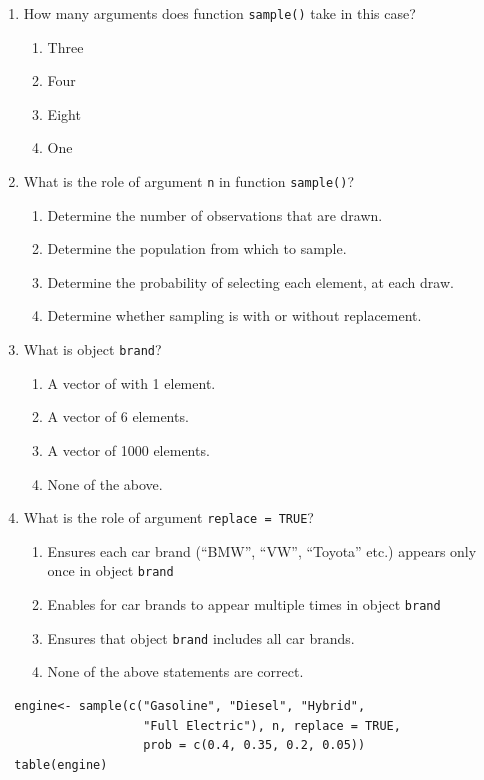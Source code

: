 \documentclass{article}
\begin{document}
\begin{enumerate}[resume]
  \item How many arguments does function \texttt{sample()} take in this case?
  \begin{enumerate}[label=\Alph*)]
    \item Three
    \item Four
    \item Eight
    \item One 
  \end{enumerate}
  \item What is the role of argument \texttt{n} in function \texttt{sample()}?
  \begin{enumerate}[label=\Alph*)]
    \item Determine the number of observations that are drawn.
    \item Determine the population from which to sample.
    \item Determine the probability of selecting each element, at each draw.
    \item Determine whether sampling is with or without replacement.
  \end{enumerate}
  \item What is object \texttt{brand}?
  \begin{enumerate}[label=\Alph*)]
    \item A vector of with 1 element.
    \item A vector of 6 elements.
    \item A vector of 1000 elements.
    \item None of the above.
  \end{enumerate}
  \item What is the role of argument \texttt{replace = TRUE}?
  \begin{enumerate}[label=\Alph*)]
    \item Ensures each car brand (``BMW'', ``VW'', ``Toyota'' etc.) appears only once in object \texttt{brand}
    \item Enables for car brands to appear multiple times in object \texttt{brand}
    \item Ensures that object \texttt{brand} includes all car brands.
    \item None of the above statements are correct.
  \end{enumerate}
\end{enumerate}

\newpage

\begin{lstlisting}
  engine<- sample(c("Gasoline", "Diesel", "Hybrid", 
                    "Full Electric"), n, replace = TRUE,
                    prob = c(0.4, 0.35, 0.2, 0.05))
  table(engine)
\end{lstlisting}
\end{document}
